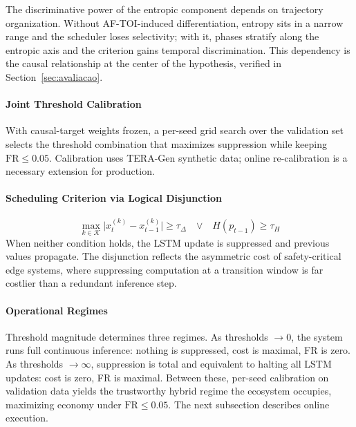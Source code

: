 \documentclass[a4paper,fleqn]{cas-dc}
\newcommand{\TERAGen}{\mbox{TERA-Gen}\xspace}
\newcommand{\AFTOI}{\mbox{AF-TOI}\xspace}
\begin{document}
The discriminative power of the entropic component depends on trajectory
organization. Without \AFTOI-induced differentiation, entropy sits in a narrow
range and the scheduler loses selectivity; with it, phases stratify along the
entropic axis and the criterion gains temporal discrimination. This dependency
is the causal relationship at the center of the hypothesis, verified in
Section~\ref{sec:avaliacao}.
\paragraph{Joint Threshold Calibration}
With causal-target weights frozen, a per-seed grid search over the validation
set selects the threshold combination that maximizes suppression while keeping
$\mathrm{FR} \le 0.05$. Calibration uses \TERAGen synthetic data; online
re-calibration is a necessary extension for production.
\paragraph{Scheduling Criterion via Logical Disjunction}
\begin{equation}
\max_{k \in \mathcal{K}} \bigl|x_t^{(k)} - x_{t-1}^{(k)}\bigr| \ge \tau_\Delta
\quad \boldsymbol{\lor} \quad H(p_{t-1}) \ge \tau_H
\label{eq:gating}
\end{equation}
When neither condition holds, the LSTM update is suppressed and previous values
propagate. The disjunction reflects the asymmetric cost of safety-critical edge
systems, where suppressing computation at a transition window is far costlier
than a redundant inference step.
\paragraph{Operational Regimes}
Threshold magnitude determines three regimes. As thresholds $\to 0$, the system
runs full continuous inference: nothing is suppressed, cost is maximal, FR is
zero. As thresholds $\to \infty$, suppression is total and equivalent to halting
all LSTM updates: cost is zero, FR is maximal. Between these, per-seed
calibration on validation data yields the trustworthy hybrid regime the
ecosystem occupies, maximizing economy under $\mathrm{FR}\le0.05$. The next
subsection describes online execution.
\end{document}
